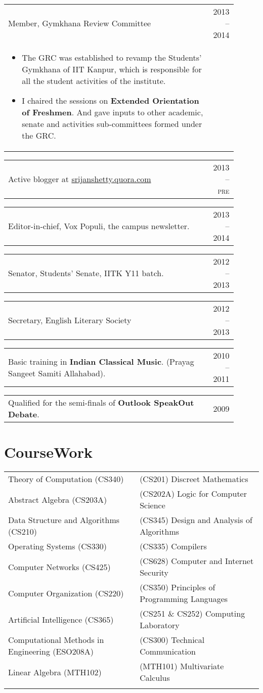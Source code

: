 \documentclass[a4paper,10pt]{article} %
\newcommand{\projectlistdated}[3]{
    \begin{tabular}{p{0.9\linewidth}r}
        \textcolor{NavyBlue}{#2} & \textsc{#1}\\
        \vspace{-0.3cm}
        \footnotesize{#3}
    \end{tabular}
    \vspace{-0.4cm}
}
\newcommand{\skill}[2]{
    \begin{tabular}{p{0.9\linewidth}r}
        #2 & \textsc{#1}\\
    \end{tabular}
    \vspace{-0.5cm}
}
\begin{document}
\projectlistdated {2013 -- 2014}
                  {Member, Gymkhana Review Committee}
                  {
                       \begin{itemize}
                           \item The GRC was established to revamp the Students' Gymkhana of IIT Kanpur,
                               which is responsible for all the student activities of the institute.
                           \item I chaired the sessions on \textbf{Extended Orientation of Freshmen}.
                               And gave inputs to other academic, senate and activities sub-committees formed under the GRC.
                       \end{itemize}
                  }

\skill {2013 -- pre}
       {Active blogger at \href{srijanshetty.quora.com} {srijanshetty.quora.com}}

\skill {2013 -- 2014}
       {Editor-in-chief, Vox Populi, the campus newsletter.}

\skill {2012 -- 2013}
       {Senator, Students' Senate, IITK Y11 batch.}

\skill {2012 -- 2013}
       {Secretary, English Literary Society}

\skill {2010 -- 2011}
       {Basic training in \textbf{Indian Classical Music}. (Prayag Sangeet Samiti Allahabad).}

\skill {2009}
       {Qualified for the semi-finals of \textbf{Outlook SpeakOut Debate}.}


\section{CourseWork}

\begin{tabular}{>{\raggedleft}p{8cm}|p{8cm}}

    Theory of Computation (CS340) & (CS201) Discreet Mathematics \\
    Abstract Algebra (CS203A) & (CS202A) Logic for Computer Science \\
    Data Structure and Algorithms (CS210) & (CS345) Design and Analysis of Algorithms \\
    Operating Systems (CS330) & (CS335) Compilers \\
    Computer Networks (CS425) &  (CS628) Computer and Internet Security \\
    Computer Organization (CS220) & (CS350) Principles of Programming Languages \\
    Artificial Intelligence (CS365) & (CS251 \& CS252) Computing Laboratory \\
    Computational Methods in Engineering (ESO208A) & (CS300) Technical Communication \\
    Linear Algebra (MTH102) &  (MTH101) Multivariate Calculus \\
                     \\
\end{tabular}
\end{document}
